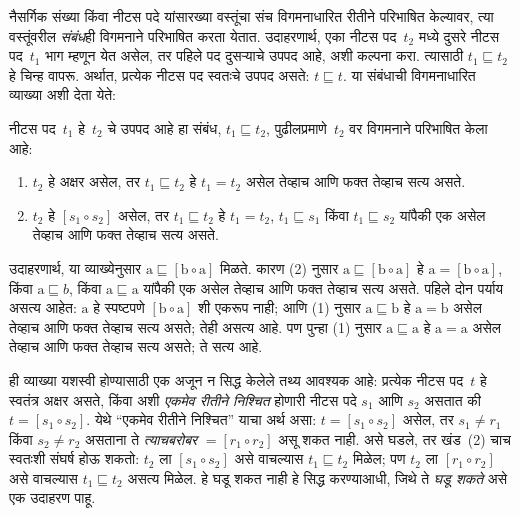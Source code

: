 \documentclass[../../../include/open-logic-section]{subfiles}
\begin{document}


नैसर्गिक संख्या किंवा नीटस पदे यांसारख्या वस्तूंचा संच विगमनाधारित रीतीने परिभाषित केल्यावर, त्या वस्तूंवरील \emph{संबंध}ही विगमनाने परिभाषित करता येतात. उदाहरणार्थ, एका नीटस पद~$t_2$ मध्ये दुसरे नीटस पद~$t_1$ भाग म्हणून येत असेल, तर पहिले पद दुसऱ्याचे उपपद आहे, अशी कल्पना करा. त्यासाठी $t_1 \sqsubseteq t_2$ हे चिन्ह वापरू. अर्थात, प्रत्येक नीटस पद स्वतःचे उपपद असते: $t \sqsubseteq t$. या संबंधाची विगमनाधारित व्याख्या अशी देता येते:

\begin{defn}
नीटस पद~$t_1$ हे~$t_2$ चे उपपद आहे हा संबंध, $t_1 \sqsubseteq t_2$, पुढीलप्रमाणे~$t_2$ वर विगमनाने परिभाषित केला आहे:
\begin{enumerate}
\item $t_2$ हे अक्षर असेल, तर $t_1 \sqsubseteq t_2$ हे $t_1 = t_2$ असेल तेव्हाच आणि फक्त तेव्हाच सत्य असते.
\item $t_2$ हे $[s_1 \circ s_2]$ असेल, तर $t_1 \sqsubseteq t_2$ हे $t_1 = t_2$, $t_1 \sqsubseteq s_1$ किंवा $t_1 \sqsubseteq s_2$ यांपैकी एक असेल तेव्हाच आणि फक्त तेव्हाच सत्य असते.
\end{enumerate}
\end{defn}

उदाहरणार्थ, या व्याख्येनुसार $\mathrm{a} \sqsubseteq [\mathrm{b} \circ \mathrm{a}]$ मिळते. कारण (2) नुसार $\mathrm{a} \sqsubseteq [\mathrm{b} \circ \mathrm{a}]$ हे $\mathrm{a} = [\mathrm{b} \circ \mathrm{a}]$, किंवा $\mathrm{a} \sqsubseteq b$, किंवा $\mathrm{a} \sqsubseteq \mathrm{a}$ यांपैकी एक असेल तेव्हाच आणि फक्त तेव्हाच सत्य असते. पहिले दोन पर्याय असत्य आहेत: $\mathrm{a}$ हे स्पष्टपणे $[\mathrm{b} \circ \mathrm{a}]$ शी एकरूप नाही; आणि (1) नुसार $\mathrm{a} \sqsubseteq \mathrm{b}$ हे $\mathrm{a} = \mathrm{b}$ असेल तेव्हाच आणि फक्त तेव्हाच सत्य असते; तेही असत्य आहे. पण पुन्हा (1) नुसार $\mathrm{a} \sqsubseteq \mathrm{a}$ हे $\mathrm{a} = \mathrm{a}$ असेल तेव्हाच आणि फक्त तेव्हाच सत्य असते; ते सत्य आहे.

ही व्याख्या यशस्वी होण्यासाठी एक अजून न सिद्ध केलेले तथ्य आवश्यक आहे: प्रत्येक नीटस पद~$t$ हे स्वतंत्र अक्षर असते, किंवा अशी \emph{एकमेव रीतीने निश्चित} होणारी नीटस पदे $s_1$ आणि $s_2$ असतात की $t = [s_1 \circ s_2]$. येथे “एकमेव रीतीने निश्चित” याचा अर्थ असा: $t = [s_1 \circ s_2]$ असेल, तर $s_1 \neq r_1$ किंवा $s_2 \neq r_2$ असताना ते \emph{त्याचबरोबर} $= [r_1 \circ r_2]$ असू शकत नाही. असे घडले, तर खंड~(2) चाच स्वतःशी संघर्ष होऊ शकतो: $t_2$ ला $[s_1 \circ s_2]$ असे वाचल्यास $t_1 \sqsubseteq t_2$ मिळेल; पण $t_2$ ला $[r_1 \circ r_2]$ असे वाचल्यास $t_1 \sqsubseteq t_2$ असत्य मिळेल. हे घडू शकत नाही हे सिद्ध करण्याआधी, जिथे ते \emph{घडू शकते} असे एक उदाहरण पाहू.
\end{document}
